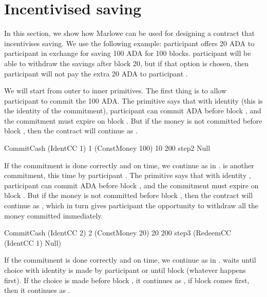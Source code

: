 \documentclass[runningheads]{llncs}
\begin{document}
\section{Incentivised saving}
\label{section:example-saving}

In this section, we show how Marlowe can be used for designing a contract that incentivises saving. We use the 
following example: participant  offers 20 ADA to participant  in exchange for saving 
100 ADA for 100 blocks. participant  will be able to withdraw the savings after block 20, but if that 
option is chosen, then participant  will not pay the extra 20 ADA to participant .

We will start from outer to inner primitives. The first thing is to allow participant  to commit the 
100 ADA. The primitive says that with identity  (this is the identity of the commitment), 
participant  can commit  ADA before block , and the commitment 
must expire on block . But if the money is not committed before block , then the 
contract will continue as .

\begin{haskellcode}
CommitCash (IdentCC 1) 1 (ConstMoney 100) 10 200
           step2
           Null
\end{haskellcode}

If the commitment is done correctly and on time, we continue as in .  is 
another commitment, this time by participant . The primitive says that with identity 
, participant  can commit  ADA before block 
, and the commitment must expire on block . But if the money is not committed 
before block , then the contract will continue as , which in 
turn gives participant  the opportunity to withdraw all the money committed immediately.

\begin{haskellcode}
CommitCash (IdentCC 2) 2 (ConstMoney 20) 20 200
           step3
           (RedeemCC (IdentCC 1) Null)
\end{haskellcode}

If the commitment is done correctly and on time, we continue as in . 
waits until choice with identity  is made by participant  or
until block  (whatever happens first). If the choice is made before block , 
it continues as , if block  comes first, then it continues as 
.
\end{document}
